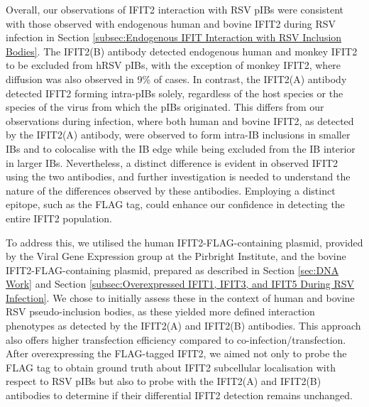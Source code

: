 Overall, our observations of IFIT2 interaction with RSV pIBs were consistent with those observed with endogenous human and bovine IFIT2 during RSV infection in Section \ref{subsec:Endogenous IFIT Interaction with RSV Inclusion Bodies}. The IFIT2(B) antibody detected endogenous human and monkey IFIT2 to be excluded from hRSV pIBs, with the exception of monkey IFIT2, where diffusion was also observed in 9\% of cases. In contrast, the IFIT2(A) antibody detected IFIT2 forming intra-pIBs solely, regardless of the host species or the species of the virus from which the pIBs originated. This differs from our observations during infection, where both human and bovine IFIT2, as detected by the IFIT2(A) antibody, were observed to form intra-IB inclusions in smaller IBs and to colocalise with the IB edge while being excluded from the IB interior in larger IBs. Nevertheless, a distinct difference is evident in observed IFIT2 using the two antibodies, and further investigation is needed to understand the nature of the differences observed by these antibodies. Employing a distinct epitope, such as the FLAG tag, could enhance our confidence in detecting the entire IFIT2 population.

To address this, we utilised the human IFIT2-FLAG-containing plasmid, provided by the Viral Gene Expression group at the Pirbright Institute, and the bovine IFIT2-FLAG-containing plasmid, prepared as described in Section \ref{sec:DNA Work} and Section \ref{subsec:Overexpressed IFIT1, IFIT3, and IFIT5 During RSV Infection}. We chose to initially assess these in the context of human and bovine RSV pseudo-inclusion bodies, as these yielded more defined interaction phenotypes as detected by the IFIT2(A) and IFIT2(B) antibodies. This approach also offers higher transfection efficiency compared to co-infection/transfection. After overexpressing the FLAG-tagged IFIT2, we aimed not only to probe the FLAG tag to obtain ground truth about IFIT2 subcellular localisation with respect to RSV pIBs but also to probe with the IFIT2(A) and IFIT2(B) antibodies to determine if their differential IFIT2 detection remains unchanged.

